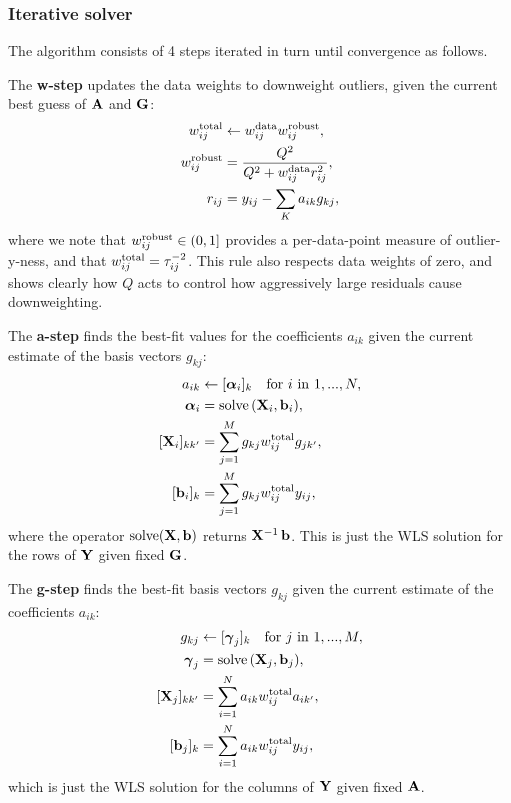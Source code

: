 \documentclass[onecolumn,floatfix]{aastex631}
\DeclareMathOperator{\solve}{solve}
\begin{document}
\subsubsection{Iterative solver}

The algorithm consists of 4 steps iterated in turn until convergence as follows.

The \textbf{w-step} updates the data weights to downweight outliers, given the current best guess of ${\bf A}$ and ${\bf G}$:
\begin{align}
    w^{\rm total}_{ij} &\leftarrow w^{\rm data}_{ij} w^{\rm robust}_{ij}, \\
    w^{\rm robust}_{ij} & = \frac{Q^2}{Q^2 + w_{ij}^{\rm data} r_{ij}^2}, \label{eq:w_robust} \\
    r_{ij} &= y_{ij} - \sum_K a_{ik} g_{kj},
\end{align}
where we note that $w^{\rm robust}_{ij} \in (0, 1]$ provides a per-data-point measure of outlier-y-ness, and that $w_{ij}^{\rm total} = \tau_{ij}^{-2}$.
This rule also respects data weights of zero, and shows clearly how $Q$ acts to control how aggressively large residuals cause downweighting.

The \textbf{a-step} finds the best-fit values for the coefficients $a_{ik}$ given the current estimate of the basis vectors $g_{kj}$:
\begin{align}
    a_{ik} &\leftarrow [{\boldsymbol{\alpha}}_i]_k \quad {\rm for} \,\, i \,\, {\rm in} \,\, 1,...,N, \\
    \boldsymbol{\alpha}_i &= \solve{\left( {\bf X}_i, {\bf b}_i \right)}, \\
    [{\bf X}_i]_{kk'} &= \sum_{j=1}^M g_{kj} w_{ij}^{\rm total} g_{jk'}, \\
    [{\bf b}_i]_k &= \sum_{j=1}^M g_{kj} w_{ij}^{\rm total} y_{ij},
\end{align}
where the operator $\solve({\bf X}, {\bf b})$ returns ${\bf X}^{-1}\,{\bf b}$.
This is just the WLS solution for the rows of ${\bf Y}$ given fixed ${\bf G}$.

The \textbf{g-step} finds the best-fit basis vectors $g_{kj}$ given the current estimate of the coefficients $a_{ik}$:
\begin{align}
    g_{kj} &\leftarrow [\boldsymbol{\gamma}_j]_k \quad {\rm for} \,\, j \,\, {\rm in} \,\, 1,...,M, \\
    \boldsymbol{\gamma}_j &= \solve{\left( {\bf X}_j, {\bf b}_j \right)}, \\
    [{\bf X}_j]_{kk'} &= \sum_{i=1}^N a_{ik} w_{ij}^{\rm total} a_{ik'}, \\
    [{\bf b}_j]_k &= \sum_{i=1}^N a_{ik} w_{ij}^{\rm total} y_{ij},
\end{align}
which is just the WLS solution for the columns of ${\bf Y}$ given fixed ${\bf A}$.
\end{document}
